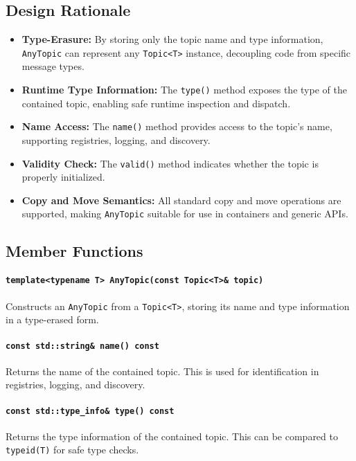 \documentclass[12pt]{report}
\begin{document}
\subsection{Design Rationale}
\begin{itemize}
    \item \textbf{Type-Erasure:} By storing only the topic name and type information, \texttt{AnyTopic} can represent any \texttt{Topic<T>} instance, decoupling code from specific message types.
    \item \textbf{Runtime Type Information:} The \texttt{type()} method exposes the type of the contained topic, enabling safe runtime inspection and dispatch.
    \item \textbf{Name Access:} The \texttt{name()} method provides access to the topic's name, supporting registries, logging, and discovery.
    \item \textbf{Validity Check:} The \texttt{valid()} method indicates whether the topic is properly initialized.
    \item \textbf{Copy and Move Semantics:} All standard copy and move operations are supported, making \texttt{AnyTopic} suitable for use in containers and generic APIs.
\end{itemize}

\subsection{Member Functions}
\paragraph{\texttt{template<typename T> AnyTopic(const Topic<T>\& topic)}}
Constructs an \texttt{AnyTopic} from a \texttt{Topic<T>}, storing its name and type information in a type-erased form.

\paragraph{\texttt{const std::string\& name() const}}
Returns the name of the contained topic. This is used for identification in registries, logging, and discovery.

\paragraph{\texttt{const std::type\_info\& type() const}}
Returns the type information of the contained topic. This can be compared to \texttt{typeid(T)} for safe type checks.
\end{document}
